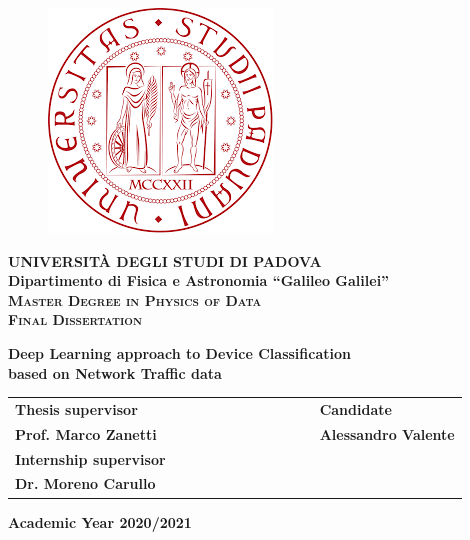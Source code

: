 \begin{titlepage}
\vspace{5mm}
\begin{figure}[hbtp]
\centering
\includegraphics[scale=.43]{images/UNIPD.png}
\end{figure}
\vspace{5mm}
\begin{center}
{{\huge{\textsc{\bf UNIVERSIT\`A DEGLI STUDI DI PADOVA}}}\\}
\vspace{5mm}
{\Large{\bf Dipartimento di Fisica e Astronomia ``Galileo Galilei''}} \\
\vspace{5mm}
{\Large{\textsc{\bf Master Degree in Physics of Data}}}\\
\vspace{15mm}
{\Large{\textsc{\bf Final Dissertation}}}\\
\vspace{18mm}
\begin{spacing}{3}
{\LARGE \textbf{Deep Learning approach to Device Classification\\ based on Network Traffic data }}\\
\end{spacing}
\vspace{8mm}
\end{center}

\vspace{20mm}
\begin{spacing}{2}
\begin{tabular}{ l  c  c c c  cc c c c c  l }
{\Large{\bf Thesis supervisor}} &&&&&&&&&&& {\Large{\bf Candidate}}\\
{\Large{\bf Prof. Marco Zanetti}} &&&&&&&&&&& {\Large{\bf Alessandro Valente}}\\
{\Large{\bf Internship supervisor}}\\
{\Large{\bf Dr. Moreno Carullo}}\\
\end{tabular}
\end{spacing}
\vspace{15 mm}

\begin{center}
{\Large{\bf Academic Year 2020/2021}}
\end{center}
\end{titlepage}







